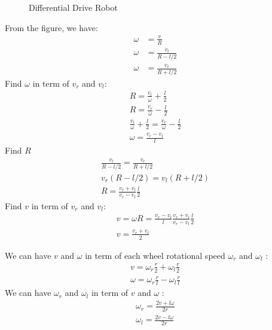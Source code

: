 \begin{figure}[h]
	\centering
	
	\caption{Differential Drive Robot}
\end{figure}
From the figure, we have:
\begin{equation}
	\begin{split}
		\omega &= \frac{v}{R}\\
		\omega &= \frac{v_l}{R-l/2}\\
		\omega &= \frac{v_r}{R+l/2}
	\end{split}
\end{equation}
Find $\omega$ in term of $v_r$ and $v_l$:
\begin{equation}
	\begin{split}
		R = \frac{v_l}{\omega} + \frac{l}{2}\\
		R = \frac{v_r}{\omega} - \frac{l}{2}\\
		\frac{v_l}{\omega} + \frac{l}{2} = \frac{v_r}{\omega} - \frac{l}{2}\\
		\omega = \frac{v_r - v_l}{l}
	\end{split}
\end{equation}
Find $R$
\begin{equation}
	\begin{split}
		\frac{v_l}{R-l/2} = \frac{v_r}{R+l/2}\\
		v_r(R-l/2) = v_l(R+l/2) \\
		R = \frac{v_r + v_l}{v_r - v_l}\frac{l}{2}
	\end{split}
\end{equation}
Find $v$ in term of $v_r$ and $v_l$:
\begin{equation}
	\begin{split}
		v = \omega R = \frac{v_r - v_l}{l} \frac{v_r + v_l}{v_r - v_l}\frac{l}{2}\\
		v = \frac{v_r+v_l}{2}
	\end{split}
\end{equation}
\begin{tcolorbox}[title={Relation of $v,\omega$ with $\omega_l,\omega_r$}]
	We can have $v$ and $\omega$ in term of each wheel rotational speed $\omega_r$ and $\omega_l$ :
	\begin{equation}
		\begin{split}
			v = \omega_r\frac{r}{2} + \omega_l\frac{r}{2}\\
			\omega = \omega_r\frac{r}{l} - \omega_l\frac{r}{l}
		\end{split}
	\end{equation}
	We can have $\omega_r$ and $\omega_l$ in term of $v$ and $\omega$ : 
	\begin{equation}
		\begin{split}
			\omega_r = \frac{2v+l\omega}{2r}\\
			\omega_l = \frac{2v-l\omega}{2r}
		\end{split}
	\end{equation}
\end{tcolorbox}

